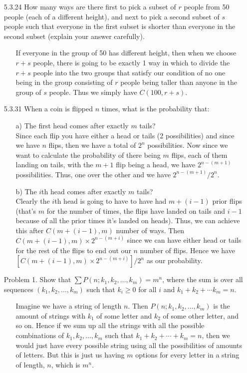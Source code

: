 \documentclass[12pt]{article}
\begin{document}
\begin{enumerate}
\item[5.3.24] How many ways are there first to pick a subset of $r$ people from 50 people (each of a different height), and next to pick a second subset of $s$ people such that everyone in the first subset is shorter than everyone in the second subset (explain your answer carefully).
\begin{enumerate}
\item[] If everyone in the group of 50 has different height, then when we choose $r + s$ people, there is going
to be exactly 1 way in which to divide the $r + s$ people into the two groups that satisfy our condition of
no one being in the group consisting of $r$ people being taller than anyone in the group of $s$ people. Thus we
simply have $C(100, r + s)$.
\end{enumerate}

\item[5.3.31] When a coin is flipped $n$ times, what is the probability that:
\begin{enumerate}
\item[a)] The first head comes after exactly $m$ tails? \\
Since each flip you have either a head or tails (2 possibilities) and since we have $n$ flips, then we have
a total of $2^n$ possibilities. Now since we want to calculate the probability of there being $m$ flips, each
of them landing on tails, with the $m + 1$ flip being a head, we have $2^{n - (m + 1)}$ possibilities. Thus, one 
over the other and we have $2^{n - (m + 1)}/2^n$.
\item[b)] The $i$th head comes after exactly $m$ tails? \\
Clearly the $i$th head is going to have to have had $m + (i - 1)$ prior flips (that's $m$ for the number
of times, the flips have landed on tails and $i - 1$ because of all the prior times it's landed on heads). Thus, 
we can achieve this after $C(m + (i - 1), m)$ number of ways. Then $C(m + (i - 1), m) \times 2^{n - (m + i)}$ since
we can have either head or tails for the rest of the flips to end out our $n$ number of flips. Hence we have
$[C(m + (i - 1), m) \times 2^{n - (m + i)}]/2^n$ as our probability.
\end{enumerate}

\item[Problem 1.] Show that $\sum P(n; k_1, k_2, \ldots, k_m) = m^n$, where the sum is over all
sequences $(k_1, k_2, \ldots, k_m)$ such that $k_i \geq 0$ for all $i$ and $k_1 + k_2 + \cdots 
k_m = n$.
\begin{enumerate}
\item[] Imagine we have a string of length $n$. Then $P(n; k_1, k_2, \ldots, k_m)$ is the amount of strings with 
$k_1$ of some letter and $k_2$ of some other letter, and so on. Hence if we sum up all the strings with all
the possible combinations of $k_1, k_2, \ldots, k_m$ such that $k_1 + k_2 + \cdots + k_m = n$, then we would just have
every possible string using all the possibilities of amounts of letters. But this is just us having $m$ options for every 
letter in a string of length, $n$, which is $m^n$.
\end{enumerate}


\end{enumerate}
\end{document}
